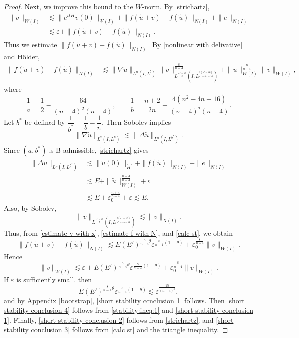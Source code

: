 \documentclass[11pt,a4paper]{article}
\numberwithin{equation}{section}
\begin{document}
\begin{proof}
Next, we improve this bound to the $W$-norm.
By \eqref{strichartz},
\begin{align*}
\|v\|_{W(I)}
&\lesssim \|e^{itH}v(0)\|_{W(I)} + \|f(\tilde{u} + v) - f(\tilde{u})\|_{N(I)} + \|e\|_{N(I)} \\
&\lesssim \varepsilon + \|f(\tilde{u} + v) - f(\tilde{u})\|_{N(I)}.
\end{align*}
Thus we estimate $\|f(\tilde{u} + v) - f(\tilde{u})\|_{N(I)}$.
By \eqref{nonlinear with delivative} and H\"older,
\begin{equation}\label{estimate f with N}
\begin{aligned}
\|f(\tilde{u} + v) - f(\tilde{u})\|_{N(I)}
&\lesssim \|\nabla \tilde{u}\|_{L^{a}(I, L^{b})}\|v\|_{L^{\frac{n^{2} - 16}{8}}(I, L^{\frac{2(n^{2}-16)}{n^{2} - 4n - 16}})}^{\frac{8}{n - 4}}
+ \|u\|_{W(I)}^{\frac{8}{n-4}}\|v\|_{W(I)},
\end{aligned}
\end{equation}
where
\[
\dfrac{1}{a} = \dfrac{1}{2} - \dfrac{64}{(n-4)^{2}(n+4)},\qquad
\dfrac{1}{b} = \dfrac{n+2}{2n} - \dfrac{4(n^{2}-4n-16)}{(n-4)^{2}(n+4)}.
\]
Let $b^{*}$ be defined by $\dfrac{1}{b^{*}} = \dfrac{1}{b} - \dfrac{1}{n}$. Then Sobolev implies
\[
\|\nabla \tilde{u}\|_{L^{a}(I, L^{b})} \lesssim \|\Delta \tilde{u}\|_{L^{a}(I, L^{b^{*}})}.
\]
Since $(a, b^{*})$ is B-admissible, \eqref{strichartz} gives
\begin{equation}\label{calc st}
\begin{aligned}
\|\Delta \tilde{u}\|_{L^{a}(I, L^{b^{*}})}
&\lesssim \|\tilde{u}(0)\|_{\dot{H}^{2}} + \|f(\tilde{u})\|_{N(I)} + \|e\|_{N(I)} \\
&\lesssim E + \|\tilde{u}\|^{\frac{n+4}{n-4}}_{W(I)} + \varepsilon \\
&\lesssim E + \varepsilon_{0}^{\frac{n+4}{n-4}} + \varepsilon \lesssim E.
\end{aligned}
\end{equation}
Also, by Sobolev,
\[
\|v\|_{L^{\frac{n^{2} - 16}{8}}(I, L^{\frac{2(n^{2}-16)}{n^{2} - 4n - 16}})} \lesssim \|v\|_{X(I)}.
\]
Thus, from \eqref{estimate v with x}, \eqref{estimate f with N}, and \eqref{calc st}, we obtain
\begin{equation}\label{stability:ineq:1}
\|f(\tilde{u} + v) - f(\tilde{u})\|_{N(I)} \lesssim E(E')^{\frac{8}{n-4}\theta}\varepsilon^{\frac{8}{n-4}(1 - \theta)} + \varepsilon_{0}^{\frac{8}{n-4}}\|v\|_{W(I)}.
\end{equation}
Hence
\[
 \|v\|_{W(I)} \lesssim \varepsilon + E(E')^{\frac{8}{n-4}\theta}\varepsilon^{\frac{8}{n-4}(1 - \theta)} + \varepsilon_{0}^{\frac{8}{n-4}}\|v\|_{W(I)}.
\]
If $\varepsilon$ is sufficiently small, then
\[
E(E')^{\frac{8}{n-4}\theta}\varepsilon^{\frac{8}{n-4}(1 - \theta)} \lesssim \varepsilon^{\frac{15}{(n-4)^{3}}},
\]
and by Appendix \ref{bootstrap}, \eqref{short stability conclusion 1} follows.
Then \eqref{short stability conclusion 4} follows from \eqref{stability:ineq:1} and \eqref{short stability conclusion 1}. Finally, \eqref{short stability conclusion 2} follows from \eqref{strichartz}, and \eqref{short stability conclusion 3} follows from \eqref{calc st} and the triangle inequality.
\end{proof}
\end{document}
